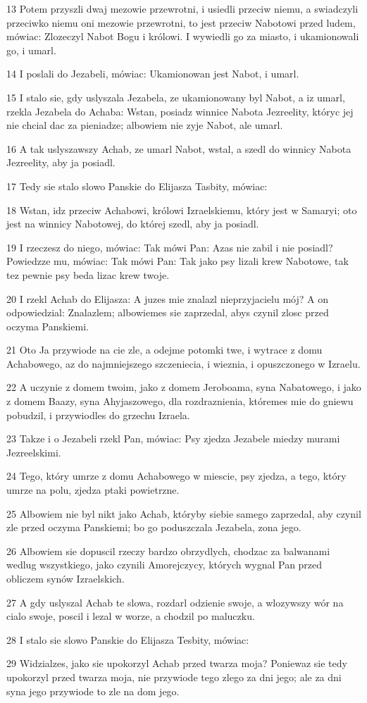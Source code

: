 \par 13 Potem przyszli dwaj mezowie przewrotni, i usiedli przeciw niemu, a swiadczyli przeciwko niemu oni mezowie przewrotni, to jest przeciw Nabotowi przed ludem, mówiac: Zlozeczyl Nabot Bogu i królowi. I wywiedli go za miasto, i ukamionowali go, i umarl.
\par 14 I poslali do Jezabeli, mówiac: Ukamionowan jest Nabot, i umarl.
\par 15 I stalo sie, gdy uslyszala Jezabela, ze ukamionowany byl Nabot, a iz umarl, rzekla Jezabela do Achaba: Wstan, posiadz winnice Nabota Jezreelity, któryc jej nie chcial dac za pieniadze; albowiem nie zyje Nabot, ale umarl.
\par 16 A tak uslyszawszy Achab, ze umarl Nabot, wstal, a szedl do winnicy Nabota Jezreelity, aby ja posiadl.
\par 17 Tedy sie stalo slowo Panskie do Elijasza Tasbity, mówiac:
\par 18 Wstan, idz przeciw Achabowi, królowi Izraelskiemu, który jest w Samaryi; oto jest na winnicy Nabotowej, do której szedl, aby ja posiadl.
\par 19 I rzeczesz do niego, mówiac: Tak mówi Pan: Azas nie zabil i nie posiadl? Powiedzze mu, mówiac: Tak mówi Pan: Tak jako psy lizali krew Nabotowe, tak tez pewnie psy beda lizac krew twoje.
\par 20 I rzekl Achab do Elijasza: A juzes mie znalazl nieprzyjacielu mój? A on odpowiedzial: Znalazlem; albowiemes sie zaprzedal, abys czynil zlosc przed oczyma Panskiemi.
\par 21 Oto Ja przywiode na cie zle, a odejme potomki twe, i wytrace z domu Achabowego, az do najmniejszego szczeniecia, i wieznia, i opuszczonego w Izraelu.
\par 22 A uczynie z domem twoim, jako z domem Jeroboama, syna Nabatowego, i jako z domem Baazy, syna Ahyjaszowego, dla rozdraznienia, któremes mie do gniewu pobudzil, i przywiodles do grzechu Izraela.
\par 23 Takze i o Jezabeli rzekl Pan, mówiac: Psy zjedza Jezabele miedzy murami Jezreelskimi.
\par 24 Tego, który umrze z domu Achabowego w miescie, psy zjedza, a tego, który umrze na polu, zjedza ptaki powietrzne.
\par 25 Albowiem nie byl nikt jako Achab, któryby siebie samego zaprzedal, aby czynil zle przed oczyma Panskiemi; bo go poduszczala Jezabela, zona jego.
\par 26 Albowiem sie dopuscil rzeczy bardzo obrzydlych, chodzac za balwanami wedlug wszystkiego, jako czynili Amorejczycy, których wygnal Pan przed obliczem synów Izraelskich.
\par 27 A gdy uslyszal Achab te slowa, rozdarl odzienie swoje, a wlozywszy wór na cialo swoje, poscil i lezal w worze, a chodzil po maluczku.
\par 28 I stalo sie slowo Panskie do Elijasza Tesbity, mówiac:
\par 29 Widzialzes, jako sie upokorzyl Achab przed twarza moja? Poniewaz sie tedy upokorzyl przed twarza moja, nie przywiode tego zlego za dni jego; ale za dni syna jego przywiode to zle na dom jego.

